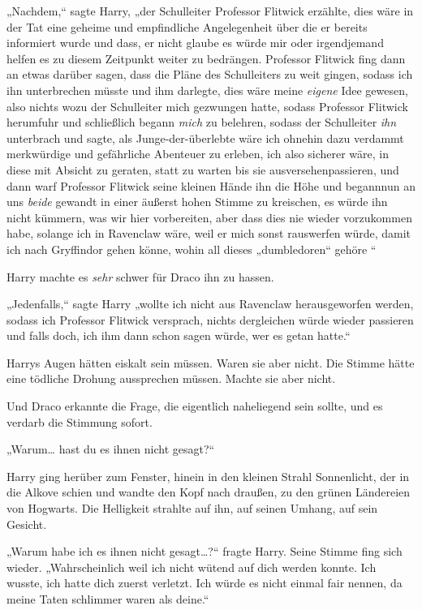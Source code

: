 {„Nachdem,“ sagte Harry, „der Schulleiter Professor Flitwick erzählte, dies wäre in der Tat eine geheime und empfindliche Angelegenheit über die er bereits informiert wurde und dass, er nicht glaube es würde mir oder irgendjemand helfen es zu diesem Zeitpunkt weiter zu bedrängen. Professor Flitwick fing dann an etwas darüber sagen, dass die Pläne des Schulleiters zu weit gingen, sodass ich ihn unterbrechen müsste und ihm darlegte, dies wäre meine \emph{eigene} Idee gewesen, also nichts wozu der Schulleiter mich gezwungen hatte, sodass Professor Flitwick herumfuhr und schließlich begann \emph{mich} zu belehren, sodass der Schulleiter \emph{ihn} unterbrach und sagte, als Junge-der-überlebte wäre ich ohnehin dazu verdammt merkwürdige und gefährliche Abenteuer zu erleben, ich also sicherer wäre, in diese mit Absicht zu geraten, statt zu warten bis sie ausversehenpassieren, und dann warf Professor Flitwick seine kleinen Hände ihn die Höhe und begannnun an uns \emph{beide} gewandt in einer äußerst hohen Stimme zu kreischen, es würde ihn nicht kümmern, was wir hier vorbereiten, aber dass dies nie wieder vorzukommen habe, solange ich in Ravenclaw wäre, weil er mich sonst rauswerfen würde, damit ich nach Gryffindor gehen könne, wohin all dieses „dumbledoren“ gehöre \later“

Harry machte es \emph{sehr} schwer für Draco ihn zu hassen.

„Jedenfalls,“ sagte Harry „wollte ich nicht aus Ravenclaw herausgeworfen werden, sodass ich Professor Flitwick versprach, nichts dergleichen würde wieder passieren und falls doch, ich ihm dann schon sagen würde, wer es getan hatte.“

Harrys Augen hätten eiskalt sein müssen. Waren sie aber nicht. Die Stimme hätte eine tödliche Drohung aussprechen müssen. Machte sie aber nicht.

Und Draco erkannte die Frage, die eigentlich naheliegend sein sollte, und es verdarb die Stimmung sofort.

„Warum… hast du es ihnen nicht gesagt?“

Harry ging herüber zum Fenster, hinein in den kleinen Strahl Sonnenlicht, der in die Alkove schien und wandte den Kopf nach draußen, zu den grünen Ländereien von Hogwarts. Die Helligkeit strahlte auf ihn, auf seinen Umhang, auf sein Gesicht.

„Warum habe ich es ihnen nicht gesagt…?“ fragte Harry. Seine Stimme fing sich wieder. „Wahrscheinlich weil ich nicht wütend auf dich werden konnte. Ich wusste, ich hatte dich zuerst verletzt. Ich würde es nicht einmal fair nennen, da meine Taten schlimmer waren als deine.“

}
